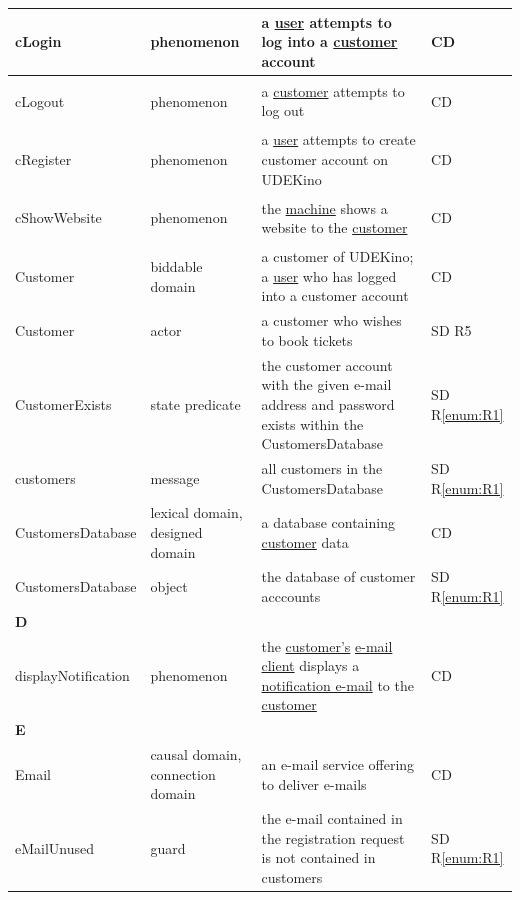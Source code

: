 \documentclass[a4paper,10pt,titlepage,bibtotoc,bibtotocnumbered]{scrreprt}
\begin{document}
\begin{longtable}{|l|p{3cm}|p{5cm}|l|}
\hline
\hypertarget{glossary:cLogin}{cLogin} & phenomenon & a \hyperlink{glossary:User}{user} attempts to log into a \hyperlink{glossary:Customer}{customer} account & CD\\
\hline
\hypertarget{glossary:cLogout}{cLogout} & phenomenon & a \hyperlink{glossary:Customer}{customer} attempts to log out & CD\\
\hline
\hypertarget{glossary:cRegister}{cRegister} & phenomenon & a \hyperlink{glossary:User}{user} attempts to create customer account on UDEKino & CD\\
\hline
\hypertarget{glossary:cShowWebsite}{cShowWebsite} & phenomenon & the \hyperlink{glossary:UDEKino}{machine} shows a website to the \hyperlink{glossary:Customer}{customer} & CD\\
\hline
\hypertarget{glossary:Customer}{Customer} & biddable domain & a customer of UDEKino; a \hyperlink{glossary:User}{user} who has logged into a customer account & CD\\
\hline
Customer & actor & a customer who wishes to book tickets & SD R5\\
\hline
CustomerExists & state predicate & the customer account with the given e-mail address and password exists within the CustomersDatabase & SD R\ref{enum:R1}\\
\hline
customers & message & all customers in the CustomersDatabase & SD R\ref{enum:R1}\\
\hline
\hypertarget{glossary:CustomersDatabase}{CustomersDatabase} & lexical domain, designed domain & a database containing \hyperlink{glossary:Customer}{customer} data & CD\\
\hline
CustomersDatabase & object & the database of customer acccounts & SD R\ref{enum:R1}\\
\hline
\multicolumn{4}{|l|}{\textbf{D}}\\
\hline
\hypertarget{glossary:displayNotification}{displayNotification} & phenomenon & the \hyperlink{glossary:Customer}{customer's} \hyperlink{glossary:Email}{e-mail client} displays a \hyperlink{glossary:notifyCustomer}{notification e-mail} to the \hyperlink{glossary:Customer}{customer} & CD\\
\hline
\multicolumn{4}{|l|}{\textbf{E}}\\
\hline
\hypertarget{glossary:Email}{Email} & causal domain, connection domain & an e-mail service offering to deliver e-mails & CD\\
\hline
eMailUnused & guard & the e-mail contained in the registration request is not contained in customers & SD R\ref{enum:R1}\\

\end{longtable}
\end{document}
